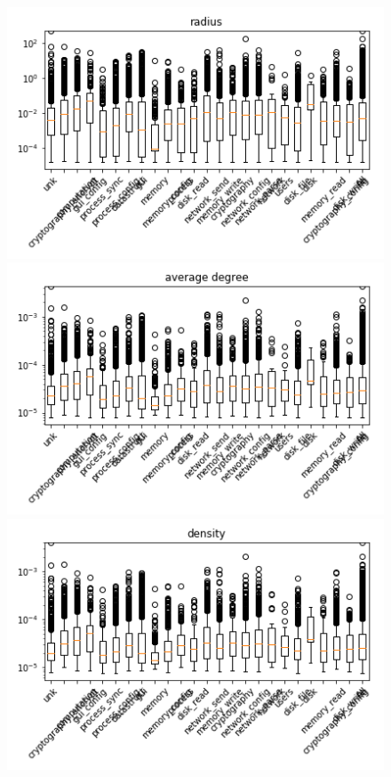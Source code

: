 \begin{appendices}
\begin{figure}[H]
\vfill 

%
\centering
\includegraphics[width=0.9\linewidth]{img/boxplots/v3_unbalanced_radius.png}
\endminipage
{}%
\centering
\includegraphics[width=0.9\linewidth]{img/boxplots/v3_unbalanced_average_degree.png}
\endminipage
{}%
\centering
\includegraphics[width=0.9\linewidth]{img/boxplots/v3_unbalanced_density.png}
\endminipage


\end{figure}
\end{appendices}
